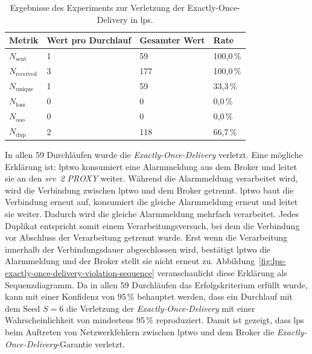 \begin{table}[H]
	\centering
	\caption{Ergebnisse des Experiments zur Verletzung der Exactly-Once-Delivery in \acrshort{lps}.}
	\label{tab:exp-lps-eod-results}
	\begin{tabular}{|l|l|l|l|}
		\hline
		\textbf{Metrik}       & \textbf{Wert pro Durchlauf} & \textbf{Gesamter Wert} & \textbf{Rate} \\
		\hline
		$N_{\text{sent}}$     & 1                           & 59                     & 100{,}0\,\%   \\
		$N_{\text{received}}$ & 3                           & 177                    & 100{,}0\,\%   \\
		$N_{\text{unique}}$   & 1                           & 59                     & 33{,}3\,\%    \\
		$N_{\text{loss}}$     & 0                           & 0                      & 0{,}0\,\%     \\
		$N_{\text{ooo}}$      & 0                           & 0                      & 0{,}0\,\%     \\
		$N_{\text{dup}}$      & 2                           & 118                    & 66{,}7\,\%    \\
		\hline
	\end{tabular}
\end{table}

\newpage

In allen 59 Durchläufen wurde die \textit{Exactly-Once-Delivery} verletzt. Eine mög\-li\-che Erklärung ist: \gls{lptwo} konsumiert eine Alarmmeldung aus dem Broker und leitet sie an den \textit{\gls{srv}~2 PROXY} weiter. Während die Alarmmeldung verarbeitet wird, wird die Verbindung zwischen \gls{lptwo} und dem Broker getrennt. \gls{lptwo} baut die Verbindung erneut auf, konsumiert die gleiche Alarmmeldung erneut und leitet sie weiter. Dadurch wird die gleiche Alarmmeldung mehrfach verarbeitet. Jedes Duplikat entspricht somit einem Verarbeitungsversuch, bei dem die Verbindung vor Abschluss der Verarbeitung getrennt wurde. Erst wenn die Verarbeitung innerhalb der Verbindungsdauer abgeschlossen wird, bestätigt \gls{lptwo} die Alarmmeldung und der Broker stellt sie nicht erneut zu. Abbildung~\ref{fig:lps-exactly-once-delivery-violation-sequence} veranschaulicht diese Erklärung als Sequenzdiagramm. Da in allen 59 Durchläufen das Erfolgskriterium erfüllt wurde, kann mit einer Konfidenz von 95\,\% behauptet werden, dass ein Durchlauf mit dem Seed $S = 6$ die Verletzung der \textit{Exactly-Once-Delivery} mit einer Wahrscheinlichkeit von mindestens 95\,\% reproduziert. Damit ist gezeigt, dass \gls{lps} beim Auftreten von Netzwerkfehlern zwischen \gls{lptwo} und dem Broker die \textit{Exactly-Once-Delivery}-Garantie verletzt.

